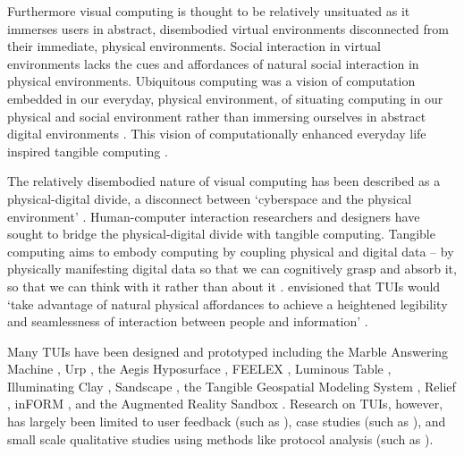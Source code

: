\documentclass{article}
\begin{document}
Furthermore visual computing is thought to be relatively unsituated as it immerses users in abstract, disembodied virtual environments disconnected from their immediate, physical environments. Social interaction in virtual environments lacks the cues and affordances of natural social interaction in physical environments. 
Ubiquitous computing was a vision of computation embedded in our everyday, physical environment, of situating computing in our physical and social environment rather than immersing ourselves in abstract digital environments \citep{Dourish2001}. This vision of computationally enhanced everyday life inspired tangible computing \citep{Ishii1997}. 

The relatively disembodied nature of visual computing has been described as a physical-digital divide, 
a disconnect between `cyberspace and the physical environment' \citep{Ishii1997}. 
Human-computer interaction researchers and designers have sought 
to bridge the physical-digital divide with tangible computing.
Tangible computing aims to embody computing 
by coupling physical and digital data \citep{Dourish2001} -- 
by physically manifesting digital data so that we can cognitively grasp and absorb it,
so that we can think with it rather than about it \citep{Kirsh2013}. 
\citeauthor{Ishii1997} envisioned that TUIs would  `take advantage of natural physical affordances to achieve a heightened legibility and seamlessness of interaction between people and information' \citeyearpar{Ishii1997}. 

Many TUIs have been designed and prototyped including 
the Marble Answering Machine \citep{Poynor1995},
Urp \citep{Underkoffler1999},
the Aegis Hyposurface \citep{Goulthorpe2000}, 
FEELEX \citep{Iwata2001}, 
Luminous Table \citep{Ishii2002}, 
Illuminating Clay \citep{Piper2002a}, 
Sandscape \citep{Ishii2004}, 
the Tangible Geospatial Modeling System \citep{Tateosian2010},
Relief \citep{Leithinger2010}, 
inFORM \citep{Follmer2013}, 
and
the Augmented Reality Sandbox \citep{Kreylos2015}.
Research on TUIs, however, has largely been limited to 
user feedback (such as \citealt{Ishii2004}),
case studies (such as \citealt{Iwata2001,Ishii2002,Tateosian2010}),
and small scale qualitative studies using methods like protocol analysis (such as \citealt{Kim2008}).
\end{document}

